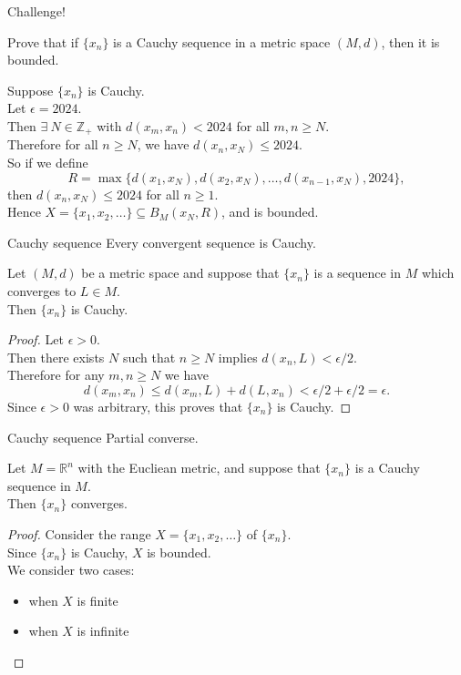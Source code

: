 \documentclass{beamer}
\begin{document}
\begin{frame}{Challenge!}
\begin{prob}
Prove that if $\{x_n\}$ is a Cauchy sequence in a metric space $(M,d)$, then it is bounded.
\end{prob}
\pause
\begin{soln}
\pause
Suppose $\{x_n\}$ is Cauchy.\\
\pause
Let $\epsilon = 2024$.\\
\pause
Then $\exists\ N\in\mathbb{Z}_+$ with $d(x_m,x_n) < 2024$ for all $m,n\geq N$.\\
\pause
Therefore for all $n\geq N$, we have $d(x_n,x_N)\leq 2024$.\\
\pause
So if we define
$$R = \max\{d(x_1,x_N), d(x_2,x_N),\dots, d(x_{n-1},x_N),2024\},$$
\pause
then $d(x_n,x_N)\leq 2024$ for all $n\geq 1$.\\
\pause
Hence $X = \{x_1,x_2,\dots\}\subseteq B_M(x_N,R)$, and is bounded.
\end{soln}
\end{frame}

\begin{frame}{Cauchy sequence}
Every convergent sequence is Cauchy.
\pause
\begin{thm}
Let $(M,d)$ be a metric space and suppose that $\{x_n\}$ is a sequence in $M$ which converges to $L\in M$.\\
Then $\{x_n\}$ is Cauchy.
\end{thm}
\pause
\begin{proof}
\pause
Let $\epsilon > 0$.\\
\pause
Then there exists $N$ such that $n\geq N$ implies $d(x_n,L) < \epsilon/2$.\\
\pause
Therefore for any $m,n\geq N$ we have
$$d(x_m,x_n)\leq d(x_m,L) + d(L,x_n) < \epsilon/2 + \epsilon/2 = \epsilon.$$
Since $\epsilon > 0$ was arbitrary, this proves that $\{x_n\}$ is Cauchy.
\end{proof}
\end{frame}

\begin{frame}{Cauchy sequence}
Partial converse.
\pause
\begin{thm}
Let $M=\mathbb R^n$ with the Eucliean metric, and suppose that $\{x_n\}$ is a Cauchy sequence in $M$.\\
Then $\{x_n\}$ converges.
\end{thm}
\pause
\begin{proof}
\pause
Consider the range $X = \{x_1,x_2,\dots\}$ of $\{x_n\}$.\\
\pause
Since $\{x_n\}$ is Cauchy, $X$ is bounded.\\
\pause
We consider two cases:
\begin{itemize}
\pause
\item when $X$ is finite
\pause
\item when $X$ is infinite
\end{itemize}
\end{proof}
\end{frame}
\end{document}
